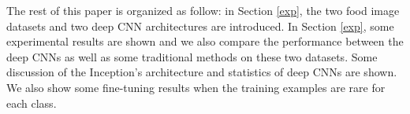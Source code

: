The rest of this paper is organized as follow: in Section \ref{exp}, the two food image datasets and two deep CNN architectures are introduced. In Section \ref{exp}, some experimental results are shown and we also compare the performance between the deep CNNs as well as some traditional methods on these two datasets. Some discussion of the Inception's architecture and statistics of deep CNNs are shown. We also show some fine-tuning results when the training examples are rare for each class.
